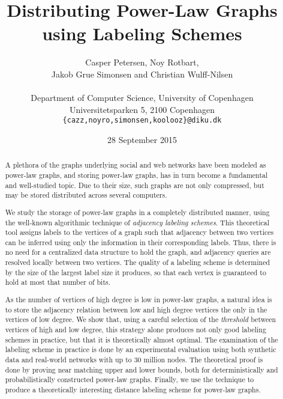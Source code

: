 \documentclass{acm_proc_article-sp}
\begin{document}
\title{Distributing Power-Law Graphs using Labeling Schemes}

\author{Casper Petersen, Noy Rotbart,\\ Jakob Grue Simonsen and Christian Wulff-Nilsen \\ \\
\small{Department of Computer Science, University of Copenhagen} \\
\small{Universitetsparken 5, 2100 Copenhagen}\\
 \small{\texttt{\{cazz,noyro,simonsen,koolooz\}@diku.dk}}  }
 

\date{28 September 2015}
\maketitle
\begin{abstract}
A plethora of the graphs underlying social and web networks  have been modeled as power-law graphs, and
storing  power-law graphs, has in turn become  a fundamental and  well-studied topic.
Due to their size, such graphs are not only compressed, but may be stored distributed across several computers.

We study the storage of  power-law graphs in a completely distributed manner, using the well-known algorithmic technique of \emph{adjacency labeling schemes}.
This theoretical tool assigns  labels to the vertices of a graph such that   adjacency between two vertices can be inferred using only the information in their corresponding labels. Thus, there is no need for a centralized data structure to hold the graph, and adjacency queries are resolved locally between two vertices. The quality of a labeling scheme is determined by the size of the largest label size it produces, so that each vertex is guaranteed to hold at most that number of bits.

As the number of vertices of high degree is low in power-law graphs, a natural idea is to store the adjacency relation between low and high degree vertices the only in the vertices of  low degree. 
We show that, using  a careful selection of the \emph{threshold} between vertices of high and low degree, this strategy alone produces not only good labeling schemes in practice, but that it is theoretically almost optimal. 
The examination of the labeling scheme in practice is done by an experimental evaluation using both synthetic data and real-world networks with up to 30 million nodes.
The theoretical proof is done by proving near matching upper and lower bounds, both for deterministically and probabilistically  constructed power-law graphs.
Finally, we use the  technique  to produce a  theoretically interesting distance labeling scheme for power-law graphs.
\end{abstract}
\end{document}

